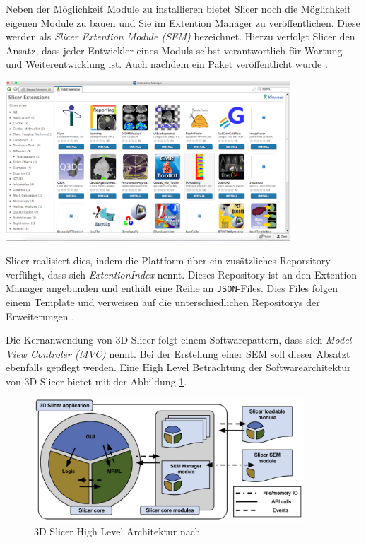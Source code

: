 \begin{minipage}{0.40\textwidth}
	Neben der Möglichkeit Module zu installieren bietet Slicer noch die Möglichkeit
	eigenen Module zu bauen und Sie im Extention Manager zu veröffentlichen. Diese
	werden als \textit{Slicer Extention Module (SEM)} bezeichnet. Hierzu verfolgt
	Slicer den Ansatz, dass jeder Entwickler eines Moduls selbst verantwortlich für
	Wartung und Weiterentwicklung ist. Auch nachdem ein Paket veröffentlicht wurde
	\citep{slicer2024}.
\end{minipage}
\hfill
\begin{minipage}{0.50\textwidth}
	\centering
	\includegraphics[width=0.8\textwidth]{img/extensions_manager.png}
	 \label{fig:3d_slicer_extention_manager}
\end{minipage}

Slicer realisiert dies, indem die Plattform über ein zusätzliches Reporsitory
verfühgt, dass sich \textit{ExtentionIndex} nennt. Dieses Repository ist an den Extention
Manager angebunden und enthält eine Reihe an \texttt{JSON}-Files. Dies Files folgen
einem Template und verweisen auf die unterschiedlichen Repositorys der Erweiterungen
\citep[vgl.][]{slicer2024}.

Die Kernanwendung von 3D Slicer folgt einem Softwarepattern, dass sich \textit{Model
View Controler (MVC)} nennt. Bei der Erstellung einer SEM soll dieser Absatzt ebenfalls
gepflegt werden. Eine High Level Betrachtung der Softwarearchitektur von 3D
Slicer bietet \cite[Seite 1332]{fedorov2012slicer} mit der Abbildung
\ref{fig:3d_slicer_architektur}.

\begin{figure}[h]
	\centering
	\includegraphics[width=0.9\textwidth]{img/3d_slicer_architektur.jpg}
	\caption{3D Slicer High Level Architektur nach \citet[Seite 1326]{fedorov2012slicer}}
	\label{fig:3d_slicer_architektur}
\end{figure}


